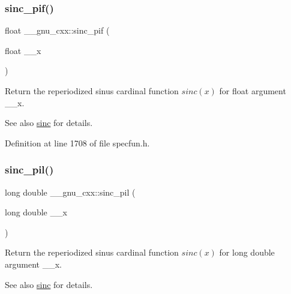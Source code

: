 \subsubsection{\texorpdfstring{sinc\+\_\+pif()}{sinc\_pif()}}
{\footnotesize\ttfamily float \+\_\+\+\_\+gnu\+\_\+cxx\+::sinc\+\_\+pif (\begin{DoxyParamCaption}\item[{float}]{\+\_\+\+\_\+x }\end{DoxyParamCaption})\hspace{0.3cm}{\ttfamily [inline]}}

Return the reperiodized sinus cardinal function $ sinc(x) $ for {\ttfamily float} argument {\ttfamily \+\_\+\+\_\+x}.

\begin{DoxySeeAlso}{See also}
\hyperlink{group__gnu__math__spec__func_ga09976b5d041113979c93613cc3700348}{sinc} for details. 
\end{DoxySeeAlso}


Definition at line 1708 of file specfun.\+h.

\mbox{\label{group__gnu__math__spec__func_gaad38a6e40b1272391a26dbb32a684b3c}} 
\subsubsection{\texorpdfstring{sinc\+\_\+pil()}{sinc\_pil()}}
{\footnotesize\ttfamily long double \+\_\+\+\_\+gnu\+\_\+cxx\+::sinc\+\_\+pil (\begin{DoxyParamCaption}\item[{long double}]{\+\_\+\+\_\+x }\end{DoxyParamCaption})\hspace{0.3cm}{\ttfamily [inline]}}

Return the reperiodized sinus cardinal function $ sinc(x) $ for {\ttfamily long double} argument {\ttfamily \+\_\+\+\_\+x}.

\begin{DoxySeeAlso}{See also}
\hyperlink{group__gnu__math__spec__func_ga09976b5d041113979c93613cc3700348}{sinc} for details. 
\end{DoxySeeAlso}


